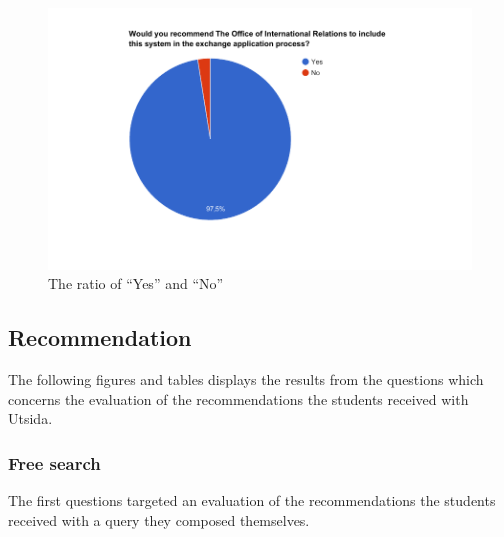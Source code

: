\begin{figure}
    \centering
    \includegraphics[width=1\textwidth]{fig/questionnaire2_diagrams/4.png}
    \caption{The ratio of \enquote{Yes} and \enquote{No}}
    \label{fig:include_system_diagram}
\end{figure}


\FloatBarrier
\subsection{Recommendation}
The following figures and tables displays the results from the questions which concerns the evaluation of the recommendations the students received with Utsida.

\subsubsection{Free search}

The first questions targeted an evaluation of the recommendations the students received with a query they composed themselves.

